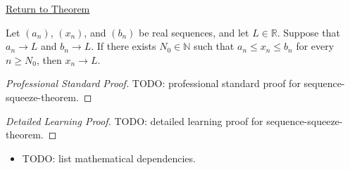 \newpage
{}
\label{prf:sequence-squeeze-theorem}

\begin{remark*}[Return]
\hyperref[thm:sequence-squeeze-theorem]{Return to Theorem}
\end{remark*}

\begin{theorem*}
Let $(a_n)$, $(x_n)$, and $(b_n)$ be real sequences, and let
$L\in\mathbb{R}$. Suppose that $a_n\to L$ and $b_n\to L$. If there
exists $N_0\in\mathbb{N}$ such that $a_n\le x_n\le b_n$ for every
$n\ge N_0$, then $x_n\to L$.

\smallskip
\noindent
\end{theorem*}

\begin{proof}[Professional Standard Proof]
\LRAProofBodyStart
TODO: professional standard proof for sequence-squeeze-theorem.
\end{proof}

\begin{proof}[Detailed Learning Proof]
\LRAProofBodyStart
TODO: detailed learning proof for sequence-squeeze-theorem.
\end{proof}

\begin{remark*}
\end{remark*}

\begin{dependencies}
\begin{itemize}
  \item TODO: list mathematical dependencies.
\end{itemize}
\end{dependencies}

\clearpage
